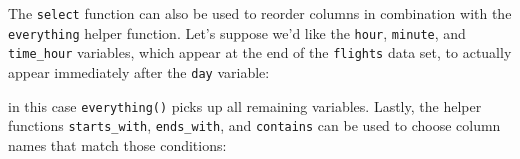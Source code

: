 \documentclass[]{tufte-book}
\newenvironment{Shaded}{\begin{snugshade}}{\end{snugshade}}
\newcommand{\KeywordTok}[1]{\textcolor[rgb]{0.13,0.29,0.53}{\textbf{{#1}}}}
\newcommand{\StringTok}[1]{\textcolor[rgb]{0.31,0.60,0.02}{{#1}}}
\newcommand{\NormalTok}[1]{{#1}}
\begin{document}
The \texttt{select} function can also be used to reorder columns in
combination with the \texttt{everything} helper function. Let's suppose
we'd like the \texttt{hour}, \texttt{minute}, and \texttt{time\_hour}
variables, which appear at the end of the \texttt{flights} data set, to
actually appear immediately after the \texttt{day} variable:

\begin{Shaded}
\end{Shaded}

in this case \texttt{everything()} picks up all remaining variables.
Lastly, the helper functions \texttt{starts\_with}, \texttt{ends\_with},
and \texttt{contains} can be used to choose column names that match
those conditions:

\begin{Shaded}
\end{Shaded}

\begin{Shaded}
\end{Shaded}

\begin{Shaded}
\end{Shaded}
\end{document}

